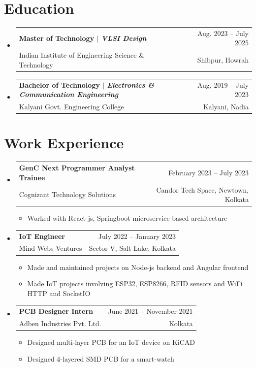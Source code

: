 \documentclass[11pt]{article}
\makeatletter
\newcommand{\CVItem}[1]{
  \item\small{
    {#1 \vspace{-2pt}}
  }
}
\newcommand{\CVSubheading}[4]{
  \vspace{-2pt}\item
    \begin{tabular*}{0.97\textwidth}[t]{l@{\extracolsep{\fill}}r}
      \textbf{#1} & #2 \\
      \small#3 & \small #4 \\
    \end{tabular*}\vspace{-7pt}
}
\newcommand{\CVSubHeadingListStart}{\begin{itemize}[leftmargin=0.5cm, label={}]}
\newcommand{\CVSubHeadingListEnd}{\end{itemize}}
\newcommand{\CVItemListStart}{\begin{itemize}}
\newcommand{\CVItemListEnd}{\end{itemize}\vspace{-5pt}}
\makeatother
\begin{document}
\section{Education}
  \CVSubHeadingListStart
    \CVSubheading
      {{Master of Technology $|$ \emph{\small{VLSI Design}}}}{Aug. 2023 -- July 2025}
      {Indian Institute of Engineering Science \& Technology}{Shibpur, Howrah}
    \CVSubheading
      {{Bachelor of Technology $|$ \emph{\small{Electronics \& Communication Engineering}}}}{Aug. 2019 -- July 2023}
      {Kalyani Govt. Engineering College}{Kalyani, Nadia}
  \CVSubHeadingListEnd

\section{Work Experience}
  \CVSubHeadingListStart
	\CVSubheading
      	{GenC Next Programmer Analyst Trainee}{February 2023 -- July 2023}
      	{Cognizant Technology Solutions}{Candor Tech Space, Newtown, Kolkata}
      \CVItemListStart
       \CVItem{Worked with React-js, Springboot microservice based architecture}
    \CVItemListEnd
    \CVSubheading
      {IoT Engineer}{July 2022 -- January 2023}
      {Mind Webs Ventures}{Sector-V, Salt Lake, Kolkata}
      \CVItemListStart
        \CVItem{Made and maintained projects on Node-js backend and Angular frontend}
        \CVItem{Made IoT projects involving ESP32, ESP8266, RFID sensors and WiFi HTTP and SocketIO}
    \CVItemListEnd
    \CVSubheading
      {PCB Designer Intern}{June 2021 -- November 2021}
      {Adben Industries Pvt. Ltd.}{Kolkata}
      \CVItemListStart
        \CVItem{Designed multi-layer PCB for an IoT device on KiCAD}
        \CVItem{Designed 4-layered SMD PCB for a smart-watch}
      \CVItemListEnd

    
  \CVSubHeadingListEnd


\end{document}
